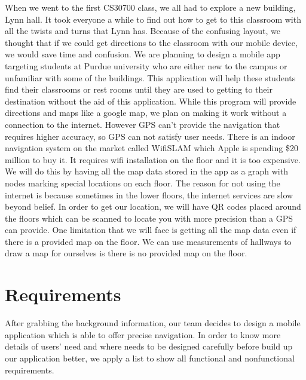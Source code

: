 \documentclass[12pt]{article}
\begin{document}
When we went to the first CS30700 class, we all had to explore a new building, Lynn hall. It took everyone a while to find out how to get to this classroom with all the twists and turns that Lynn has. Because of the confusing layout, we thought that if we could get directions to the classroom with our mobile device, we would save time and confusion. We are planning to design a mobile app targeting students at Purdue university who are either new to the campus or unfamiliar with some of the buildings. This application will help these students find their classrooms or rest rooms until they are used to getting to their destination without the aid of this application. While this program will provide directions and maps like a google map, we plan on making it work without a connection to the internet. However GPS can’t provide the navigation that requires higher accuracy, so GPS can not satisfy user needs. There is an indoor navigation system on the market called WifiSLAM which Apple is spending \$20 million to buy it. It requires wifi installation on the floor and it is too expensive. We will do this by having all the map data stored in the app as a graph with nodes marking special locations on each floor. The reason for not using the internet is because sometimes in the lower floors, the internet services are slow beyond belief. In order to get our location, we will have QR codes placed around the floors which can be scanned to locate you with more precision than a GPS can provide. One limitation that we will face is getting all the map data even if there is a provided map on the floor. We can use measurements of hallways to draw a map for ourselves is there is no provided map on the floor.


\section{Requirements}
After grabbing the background information, our team decides to design a mobile application which is able to offer precise navigation. In order to know more details of users’ need and where needs to be designed carefully before build up our application better, we apply a list to show all functional and nonfunctional requirements.
\begin{center}

\end{center}
\end{document}
